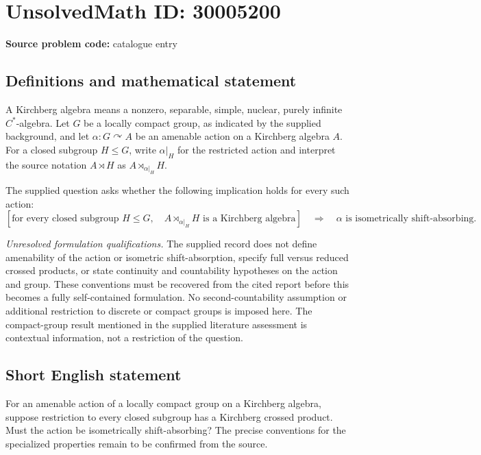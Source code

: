 \documentclass[11pt]{article}
\begin{document}
\section*{UnsolvedMath ID: 30005200}
\textbf{Source problem code:} catalogue entry
\subsection{Definitions and mathematical statement}
A Kirchberg algebra means a nonzero, separable, simple, nuclear, purely infinite \(C^*\)-algebra. Let \(G\) be a locally compact group, as indicated by the supplied background, and let \(\alpha:G\curvearrowright A\) be an amenable action on a Kirchberg algebra \(A\). For a closed subgroup \(H\leq G\), write \(\alpha|_H\) for the restricted action and interpret the source notation \(A\rtimes H\) as \(A\rtimes_{\alpha|_H}H\).

The supplied question asks whether the following implication holds for every such action:
\[
\left[
\text{for every closed subgroup }H\leq G,
\quad A\rtimes_{\alpha|_H}H
\text{ is a Kirchberg algebra}
\right]
\quad\Longrightarrow\quad
\alpha\text{ is isometrically shift-absorbing}.
\]

\emph{Unresolved formulation qualifications.} The supplied record does not define amenability of the action or isometric shift-absorption, specify full versus reduced crossed products, or state continuity and countability hypotheses on the action and group. These conventions must be recovered from the cited report before this becomes a fully self-contained formulation. No second-countability assumption or additional restriction to discrete or compact groups is imposed here. The compact-group result mentioned in the supplied literature assessment is contextual information, not a restriction of the question.
\subsection{Short English statement}
For an amenable action of a locally compact group on a Kirchberg algebra, suppose restriction to every closed subgroup has a Kirchberg crossed product. Must the action be isometrically shift-absorbing? The precise conventions for the specialized properties remain to be confirmed from the source.
\end{document}
